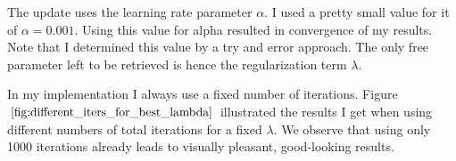 \documentclass{paper}
\begin{document}
The update uses the learning rate parameter $\alpha$. I used a pretty small value for it of $\alpha=0.001$. Using this value for alpha resulted in convergence of my results. Note that I determined this value by a try and error approach. The only free parameter left to be retrieved is hence the regularization term $\lambda$.

In my implementation I always use a fixed number of iterations. Figure $\ref{fig:different_iters_for_best_lambda}$ illustrated the results I get when using different numbers of total iterations for a fixed $\lambda$. We observe that using only 1000 iterations already leads to visually pleasant, good-looking results.

\begin{figure}[H]
\begin{center}
\end{center}
\end{figure}
\end{document}
